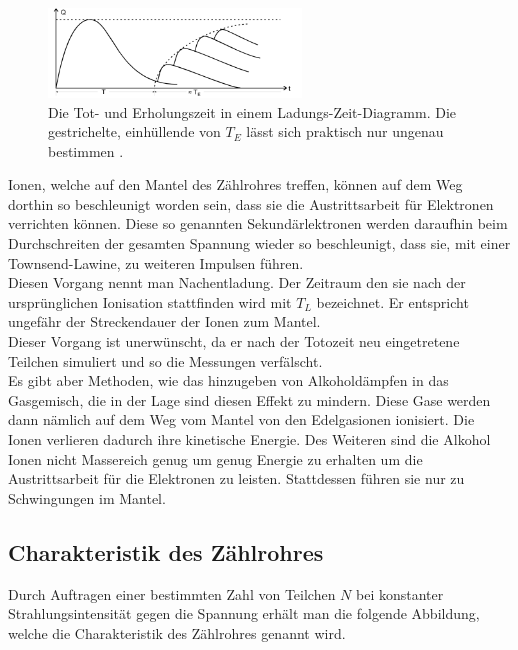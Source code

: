 \begin{figure}[H]
    \centering
    \includegraphics[width=0.6\textwidth]{images/Totozeit.PNG}
    \caption{Die Tot- und Erholungszeit in einem Ladungs-Zeit-Diagramm. Die gestrichelte, einhüllende von $T_E$ lässt sich praktisch nur ungenau bestimmen \protect \cite{V703}.}
    \label{img:tot}
\end{figure}

\noindent
Ionen, welche auf den Mantel des Zählrohres treffen, können auf dem Weg dorthin so beschleunigt worden sein, dass sie die Austrittsarbeit für Elektronen verrichten können.
Diese so genannten Sekundärlektronen werden daraufhin beim Durchschreiten der gesamten Spannung wieder so beschleunigt, dass sie, mit einer Townsend-Lawine, zu weiteren Impulsen führen.\\
Diesen Vorgang nennt man Nachentladung. Der Zeitraum den sie nach der ursprünglichen Ionisation stattfinden wird mit $T_L$ bezeichnet. Er entspricht ungefähr der Streckendauer der Ionen zum Mantel.\\
Dieser Vorgang ist unerwünscht, da er nach der Totozeit neu eingetretene Teilchen simuliert und so die Messungen verfälscht. \\
Es gibt aber Methoden, wie das hinzugeben von Alkoholdämpfen in das Gasgemisch, die in der Lage sind diesen Effekt zu mindern.
Diese Gase werden dann nämlich auf dem Weg vom Mantel von den Edelgasionen ionisiert. Die Ionen  verlieren dadurch ihre kinetische Energie. 
Des Weiteren sind die Alkohol Ionen nicht Massereich genug um genug Energie zu erhalten um die Austrittsarbeit für die Elektronen zu leisten. 
Stattdessen führen sie nur zu Schwingungen im Mantel.\\


\subsection{Charakteristik des Zählrohres}

\noindent
Durch Auftragen einer bestimmten Zahl von Teilchen $N$ bei konstanter Strahlungsintensität 
gegen die Spannung erhält man die folgende Abbildung, welche die Charakteristik des Zählrohres genannt wird.

